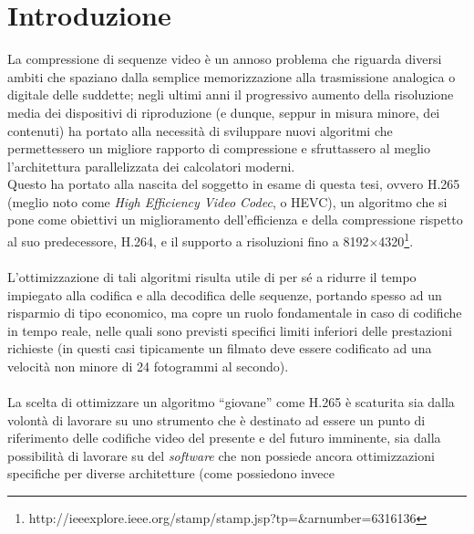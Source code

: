 
\chapter{Introduzione} %

\label{Chapter1}



La compressione di sequenze video è un annoso problema che riguarda diversi
ambiti che spaziano dalla semplice memorizzazione alla trasmissione analogica
o digitale delle suddette; negli ultimi anni il progressivo aumento
della risoluzione media dei dispositivi di riproduzione (e dunque, seppur in
misura minore, dei contenuti) ha portato alla necessità di sviluppare nuovi
algoritmi che permettessero un migliore rapporto di compressione e sfruttassero
al meglio l'architettura parallelizzata dei calcolatori moderni. \\
Questo ha portato alla nascita del soggetto in esame di questa tesi, ovvero
H.265 (meglio noto come \emph{High Efficiency Video Codec}, o HEVC), un 
algoritmo che si pone come obiettivi un miglioramento dell'efficienza e
della compressione rispetto al suo predecessore, H.264, e il supporto a
risoluzioni fino a 8192$\times$4320\footnote{
http://ieeexplore.ieee.org/stamp/stamp.jsp?tp=\&arnumber=6316136}. 
\\ \\
L'ottimizzazione di tali algoritmi risulta utile di per sé a ridurre il tempo
impiegato alla codifica e alla decodifica delle sequenze, portando spesso ad
un risparmio di tipo economico, ma copre un ruolo fondamentale in caso di
codifiche in tempo reale, nelle quali sono previsti specifici limiti inferiori
delle prestazioni richieste (in questi casi tipicamente un filmato deve essere 
codificato ad una velocità non minore di 24 fotogrammi al secondo). 
\\ \\
La scelta di ottimizzare un algoritmo ``giovane'' come H.265 è scaturita sia
dalla volontà di lavorare su uno strumento che è destinato ad essere un punto
di riferimento delle codifiche video del presente e del futuro imminente, sia
dalla possibilità di lavorare su del \emph{software} che non possiede ancora
ottimizzazioni specifiche per diverse architetture (come possiedono invece
